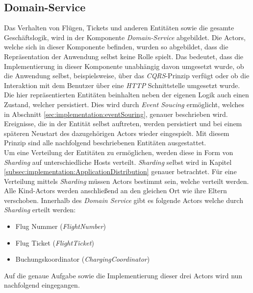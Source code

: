 \subsection{Domain-Service}
\label{subsec:implementation:domainService} 
Das Verhalten von Flügen, Tickets und anderen Entitäten sowie die gesamte Geschäftslogik, wird in der Komponente \textit{Domain-Service} abgebildet. Die Actors, welche sich in dieser Komponente befinden, wurden so abgebildet, dass die Repräsentation der Anwendung selbst keine Rolle spielt. Das bedeutet, dass die Implementierung in dieser Komponente unabhängig davon umgesetzt wurde, ob die Anwendung selbst, beispielsweise, über das \textit{CQRS}-Prinzip verfügt oder ob die Interaktion mit dem Benutzer über eine \textit{HTTP} Schnittstelle umgesetzt wurde. \\
Die hier repräsentierten Entitäten beinhalten neben der eigenen Logik auch einen Zustand, welcher persistiert. Dies wird durch \textit{Event Soucing} ermöglicht, welches in Abschnitt \ref{sec:implementation:eventSouring}, genauer beschrieben wird. Ereignisse, die in der Entität selbst auftreten, werden persistiert und bei einem späteren Neustart des dazugehörigen Actors wieder eingespielt. Mit diesem Prinzip sind alle nachfolgend beschriebenen Entitäten ausgestattet. \\
Um eine Verteilung der Entitäten zu ermöglichen, werden diese in Form von \textit{Sharding} auf unterschiedliche Hosts verteilt. \textit{Sharding} selbst wird in Kapitel \ref{subsec:implementation:ApplicationDistribution} genauer betrachtet. Für eine Verteilung mittels \textit{Sharding} müssen Actors bestimmt sein, welche verteilt werden. Alle Kind-Actors werden anschließend an den gleichen Ort wie ihre Eltern verschoben. Innerhalb des \textit{Domain Service} gibt es folgende Actors welche durch \textit{Sharding} erteilt werden:
\begin{itemize}
  \item Flug Nummer (\textit{FlightNumber})
  \item Flug Ticket (\textit{FlightTicket})
  \item Buchungskoordinator (\textit{ChargingCoordinator})
\end{itemize}
Auf die genaue Aufgabe sowie die Implementierung dieser drei Actors wird nun nachfolgend eingegangen.

